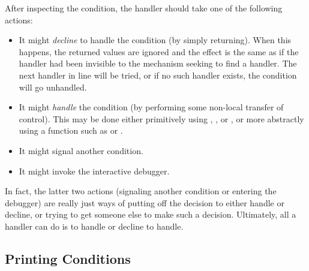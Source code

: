 After inspecting the condition, the handler should take one of the following
actions:
\begin{itemize}
  \item
    It might {\it decline} to handle the condition (by simply returning). When
    this happens, the returned values are ignored and the effect is the same
    as if the handler had been invisible to the mechanism seeking to find a
    handler. The next handler in line will be tried, or if no such handler
    exists, the condition will go unhandled.

  \item
    It might {\it handle} the condition (by performing some non-local transfer
    of control). This may be done either primitively using , , or ,
    or more abstractly using a function such as  or .

  \item
    It might signal another condition.

  \item
    It might invoke the interactive debugger.
\end{itemize}
In fact, the latter two actions (signaling another condition or entering the
debugger) are really just ways of putting off the decision to either handle
or decline, or trying to get someone else to make such a decision. Ultimately,
all a handler can do is to handle or decline to handle.

\subsection{Printing Conditions}

